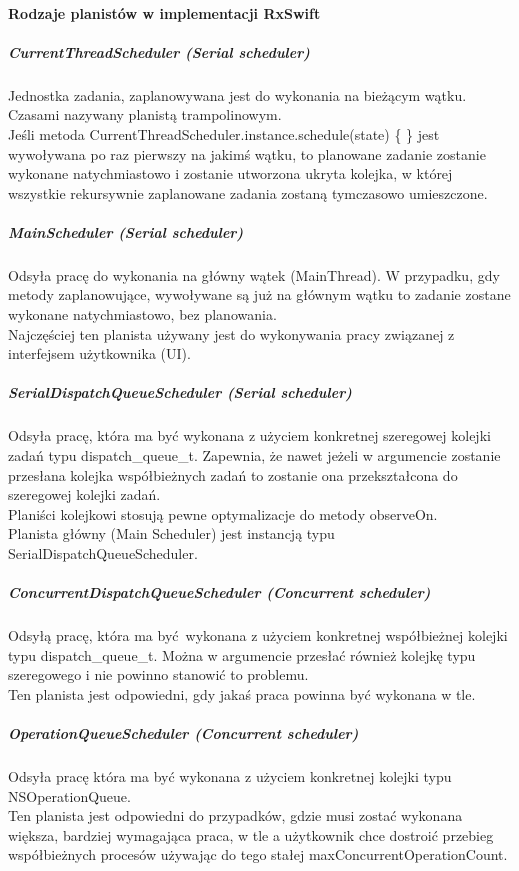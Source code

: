 \documentclass[12pt,oneside,a4paper]{report}
\begin{document}
\paragraph{Rodzaje planistów w implementacji RxSwift}
\subparagraph{CurrentThreadScheduler (Serial scheduler)}
Jednostka zadania, zaplanowywana jest do wykonania na bieżącym wątku. Czasami nazywany planistą trampolinowym. \\
Jeśli metoda CurrentThreadScheduler.instance.schedule(state) \{ \} jest wywoływana po raz pierwszy na jakimś wątku, to planowane zadanie zostanie wykonane natychmiastowo i zostanie utworzona ukryta kolejka, w której wszystkie rekursywnie zaplanowane zadania zostaną tymczasowo umieszczone.
\subparagraph{MainScheduler (Serial scheduler)}
Odsyła pracę do wykonania na główny wątek (MainThread). W przypadku, gdy metody zaplanowujące, wywoływane są już na głównym wątku to zadanie zostane wykonane natychmiastowo, bez planowania.\\
Najczęściej ten planista używany jest do wykonywania pracy związanej z interfejsem użytkownika (UI).
\subparagraph{SerialDispatchQueueScheduler (Serial scheduler)}
Odsyła pracę, która ma być wykonana z użyciem konkretnej szeregowej kolejki zadań typu dispatch\_queue\_t. Zapewnia, że nawet jeżeli w argumencie zostanie przesłana kolejka współbieżnych zadań to zostanie ona przekształcona do szeregowej kolejki zadań.\\
Planiści kolejkowi stosują pewne optymalizacje do metody observeOn.\\
Planista główny (Main Scheduler) jest instancją typu SerialDispatchQueueScheduler.
\subparagraph{ConcurrentDispatchQueueScheduler (Concurrent scheduler)}
Odsyłą pracę, która ma być wykonana z użyciem konkretnej współbieżnej kolejki  typu dispatch\_queue\_t. Można w argumencie przesłać również kolejkę typu szeregowego i nie powinno stanowić to problemu.\\
Ten planista jest odpowiedni, gdy jakaś praca powinna być wykonana w tle.
\subparagraph{OperationQueueScheduler (Concurrent scheduler)}
Odsyła pracę która ma być wykonana z użyciem konkretnej kolejki typu NSOperationQueue.\\
Ten planista jest odpowiedni do przypadków, gdzie musi zostać wykonana większa, bardziej wymagająca praca, w tle a użytkownik chce dostroić przebieg współbieżnych procesów używając do tego stałej maxConcurrentOperationCount.
\end{document}
